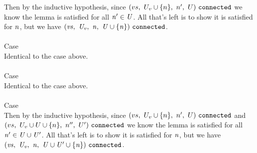 \documentclass[12pt]{article}
\begin{document}
Then by the inductive hypothesis, since $(vs,\ U_v \cup
  \{n\},\ n',\ U)\ \mathtt{connected}$ we know the lemma is satisfied for all
$\mathit{n'} \in \mathit{U}$. All that's left is to show it is satisfied for
$\mathit{n}$, but we have
$(\mathit{vs},\ \mathit{U_v},\ \mathit{n},\ \mathit{U} \cup
  \{\mathit{n}\})\ \mathtt{connected}$.\\
\\

Case
\\

Identical to the case above.\\
\\

Case
\\

Identical to the case above.\\
\\

Case
\\

Then by the inductive hypothesis, since $(vs,\ U_v \cup
  \{n\},\ n',\ U)\ \mathtt{connected}$ and $(vs,\ U_v \cup U \cup
  \{n\},\ n'',\ U')\ \mathtt{connected}$ we know the lemma is satisfied for all
$\mathit{n'} \in \mathit{U} \cup \mathit{U'}$. All that's left is to show it is
satisfied for $\mathit{n}$, but we have
$(\mathit{vs},\ \mathit{U_v},\ \mathit{n},\ \mathit{U} \cup \mathit{U'} \cup
  \{\mathit{n}\})\ \mathtt{connected}$.\\
\\
\end{document}

